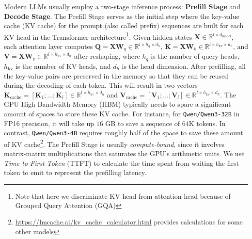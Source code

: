 Modern LLMs usually employ a two-stage inference process: \textbf{Prefill Stage} and \textbf{Decode Stage}. The Prefill Stage serves as the initial step where the key-value cache (KV cache) for the prompt (also called prefix) sequences are built for each KV head in the Transformer architecture\footnote{Note that here we discriminate KV head from attention head because of Grouped Query Attention (GQA)}. Given hidden states $\mathbf{X}\in\mathbb{R}^{l\times d_{\mathrm{model}}}$, each attention layer computes $\mathbf{Q}=\mathbf{X}\mathbf{W}_q\in\mathbb{R}^{l\times h_q\times d_h}$, $\mathbf{K}=\mathbf{X}\mathbf{W}_k\in\mathbb{R}^{l\times h_{\mathrm{kv}}\times d_h}$, and $\mathbf{V}=\mathbf{X}\mathbf{W}_v\in\mathbb{R}^{l\times h_{\mathrm{kv}}\times d_h}$ after reshaping, where $h_q$ is the number of query heads, $h_{\mathrm{kv}}$ is the number of KV heads, and $d_h$ is the head dimension. After prefilling, all the key-value pairs are preserved in the memory so that they can be reused during the decoding of each token. This will result in two vectors $\textbf{K}_{\text{cache}}=[\textbf{K}_1;\ldots;\textbf{K}_l]\in \mathbb{R}^{l\times h_{\mathrm{kv}}\times d_h}$ and $\textbf{V}_{\text{cache}}=[\textbf{V}_1;\ldots;\textbf{V}_l]\in \mathbb{R}^{l\times h_{\mathrm{kv}}\times d_h}$. The GPU High Bandwidth Memory (HBM) typically needs to spare a significant amount of spaces to store these KV cache. For instance, for \texttt{Qwen/Qwen3-32B} in FP16 precision, it will take up $16$ GB to save a sequence of $64$K tokens. In contrast, \texttt{Qwen/Qwen3-4B} requires roughly half of the space to save these amount of KV cache\footnote{\url{https://lmcache.ai/kv_cache_calculator.html} provides calculations for some other models}. The Prefill Stage is usually \emph{compute-bound}, since it involves matrix-matrix multiplications that saturates the GPU's arithmetic units. We use \emph{Time to First Token} (TTFT) to calculate the time spent from waiting the first token to emit to represent the prefilling latency.

